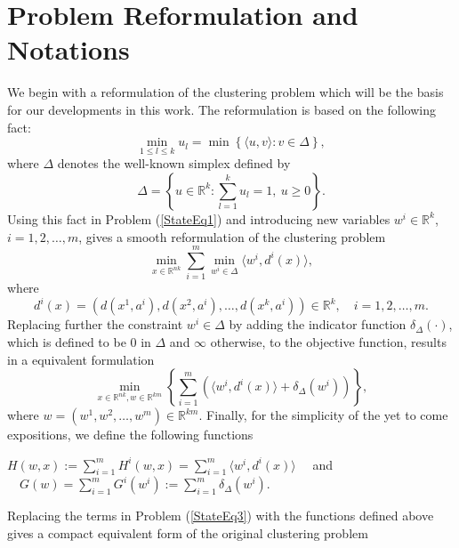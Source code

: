\documentclass[11pt]{article}
\numberwithin{equation}{section}
\begin{document}
\section{Problem Reformulation and Notations}

We begin with a reformulation of the clustering problem which will be the basis for our developments in this work. The reformulation is based on the following fact:
\begin{equation*}
	\min\limits_{1 \leq l \leq k} u_l = \min \left\lbrace \langle u,v \rangle : v \in \Delta \right\rbrace ,
\end{equation*}
where $\Delta$ denotes the well-known simplex defined by
\begin{equation*}
	\Delta = \left\lbrace u \in \mathbb{R}^k : \sum\limits_{l=1}^{k} u_l = 1, \: u \geq 0 \right\rbrace .
\end{equation*}
Using this fact in Problem (\ref{StateEq1}) and introducing new variables $w^i \in \mathbb{R}^k$, $i=1,2, \ldots, m$, gives a smooth reformulation of the clustering problem
\begin{equation}
	\min\limits_{x \in \mathbb{R}^{nk}} \sum\limits_{i=1}^{m} \min\limits_{w^i \in \Delta} \langle w^i , d^i(x) \rangle , \label{StateEq2}
\end{equation}
where 
\begin{equation*}
d^{i}(x) = (d(x^1,a^i), d(x^2,a^i), \ldots , d(x^k,a^i)) \in \mathbb{R}^k, \quad i=1, 2, \ldots , m.
\end{equation*}
Replacing further the constraint $w^i \in \Delta$ by adding the indicator function $\delta_{\Delta}(\cdot)$, which is defined to be $0$ in $\Delta$ and $\infty$ otherwise, to the objective function, results in a equivalent formulation
\begin{equation}
	\min\limits_{x \in \mathbb{R}^{nk} , w \in \mathbb{R}^{km}} \left\lbrace \sum\limits_{i=1}^{m} \left( \langle w^i , d^i(x) \rangle + \delta_{\Delta}(w^i) \right) \right\rbrace , \label{StateEq3}
\end{equation}
where $w = (w^1, w^2, \ldots , w^m) \in \mathbb{R}^{km}$.
Finally, for the simplicity of the yet to come expositions, we define the following functions
\begin{center}
$H(w,x) := \sum\limits_{i=1}^{m} H^i(w,x) = \sum\limits_{i=1}^{m} \langle w^i , d^i(x) \rangle \quad$ and $\quad G(w) = \sum\limits_{i=1}^{m} G^i(w^i) := \sum\limits_{i=1}^{m} \delta_{\Delta}(w^i) .$
\end{center}

Replacing the terms in Problem (\ref{StateEq3}) with the functions defined above gives a compact equivalent form of the original clustering problem
\end{document}
